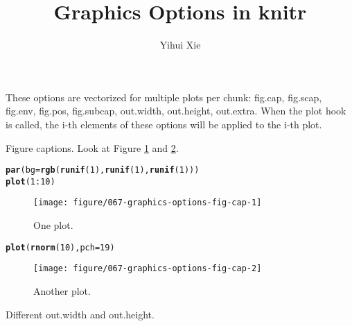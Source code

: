 \documentclass{article}\usepackage[]{graphicx}\usepackage[]{color}
\title{Graphics Options in knitr}
\author{Yihui Xie}
\makeatletter
\newcommand{\hlnum}[1]{\textcolor[rgb]{0.686,0.059,0.569}{#1}}%
\newcommand{\hlopt}[1]{\textcolor[rgb]{0,0,0}{#1}}%
\newcommand{\hlstd}[1]{\textcolor[rgb]{0.345,0.345,0.345}{#1}}%
\newcommand{\hlkwc}[1]{\textcolor[rgb]{0.333,0.667,0.333}{#1}}%
\newcommand{\hlkwd}[1]{\textcolor[rgb]{0.737,0.353,0.396}{\textbf{#1}}}%
\newenvironment{kframe}{%
 \def\at@end@of@kframe{}%
 \ifinner\ifhmode%
  \def\at@end@of@kframe{\end{minipage}}%
  \begin{minipage}{\columnwidth}%
 \fi\fi%
 \def\FrameCommand##1{\hskip\@totalleftmargin \hskip-\fboxsep
 \colorbox{shadecolor}{##1}\hskip-\fboxsep
     \hskip-\linewidth \hskip-\@totalleftmargin \hskip\columnwidth}%
 \MakeFramed {\advance\hsize-\width
   \@totalleftmargin\z@ \linewidth\hsize
   \@setminipage}}%
 {\par\unskip\endMakeFramed%
 \at@end@of@kframe}
\newenvironment{knitrout}{}{} %
\makeatother
\begin{document}
\maketitle



These options are vectorized for multiple plots per chunk: fig.cap, fig.scap, fig.env, fig.pos, fig.subcap, out.width, out.height, out.extra.
When the plot hook is called, the i-th elements of these options will be
applied to the i-th plot.

Figure captions. Look at Figure \ref{fig:fig-cap1} and \ref{fig:fig-cap2}.

\begin{knitrout}
\color{fgcolor}\begin{kframe}
\begin{alltt}
\hlkwd{par}\hlstd{(}\hlkwc{bg} \hlstd{=} \hlkwd{rgb}\hlstd{(}\hlkwd{runif}\hlstd{(}\hlnum{1}\hlstd{),} \hlkwd{runif}\hlstd{(}\hlnum{1}\hlstd{),} \hlkwd{runif}\hlstd{(}\hlnum{1}\hlstd{)))}
\hlkwd{plot}\hlstd{(}\hlnum{1}\hlopt{:}\hlnum{10}\hlstd{)}
\end{alltt}
\end{kframe}\begin{figure}[H]
\texttt{[image: figure/067-graphics-options-fig-cap-1]} \caption[One plot]{One plot.\label{fig:fig-cap1}}
\end{figure}

\begin{kframe}\begin{alltt}
\hlkwd{plot}\hlstd{(}\hlkwd{rnorm}\hlstd{(}\hlnum{10}\hlstd{),} \hlkwc{pch} \hlstd{=} \hlnum{19}\hlstd{)}
\end{alltt}
\end{kframe}\begin{figure}[H]
\texttt{[image: figure/067-graphics-options-fig-cap-2]} \caption[Another plot]{Another plot.\label{fig:fig-cap2}}
\end{figure}


\end{knitrout}

Different out.width and out.height.
\end{document}
